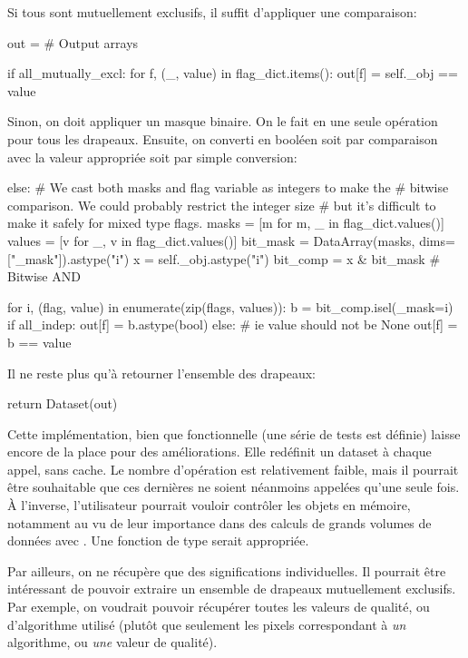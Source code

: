 Si tous sont mutuellement exclusifs, il suffit d'appliquer une comparaison:
\begin{pythonMiddle}[]
    out = {}  # Output arrays

    if all_mutually_excl:
        for f, (_, value) in flag_dict.items():
            out[f] = self._obj == value
\end{pythonMiddle}

Sinon, on doit appliquer un masque binaire. On le fait en une seule opération pour tous les drapeaux.
Ensuite, on converti en booléen soit par comparaison avec la valeur appropriée soit par simple conversion:
\begin{pythonMiddle}[]
    else:
        # We cast both masks and flag variable as integers to make the
        # bitwise comparison. We could probably restrict the integer size
        # but it's difficult to make it safely for mixed type flags.
        masks = [m for m, _ in flag_dict.values()]
        values = [v for _, v in flag_dict.values()]
        bit_mask = DataArray(masks, dims=["_mask"]).astype("i")
        x = self._obj.astype("i")
        bit_comp = x & bit_mask  # Bitwise AND

        for i, (flag, value) in enumerate(zip(flags, values)):
            b = bit_comp.isel(_mask=i)
            if all_indep:
                out[f] = b.astype(bool)
            else:  # ie value should not be None
                out[f] = b == value
\end{pythonMiddle}

Il ne reste plus qu'à retourner l'ensemble des drapeaux:
\begin{pythonLast}[]
    return Dataset(out)
\end{pythonLast}

Cette implémentation, bien que fonctionnelle (une série de tests est définie) laisse encore de la place pour des améliorations.
Elle redéfinit un dataset à chaque appel, sans cache. Le nombre d'opération est relativement faible, mais il pourrait être souhaitable que ces dernières ne soient néanmoins appelées qu'une seule fois.
À l'inverse, l'utilisateur pourrait vouloir contrôler les objets en mémoire, notamment au vu de leur importance dans des calculs de grands volumes de données avec . Une fonction de type  serait appropriée.

Par ailleurs, on ne récupère que des significations individuelles. Il pourrait être intéressant de pouvoir extraire un ensemble de drapeaux mutuellement exclusifs.
Par exemple, on voudrait pouvoir récupérer toutes les valeurs de qualité, ou d'algorithme utilisé (plutôt que seulement les pixels correspondant à \emph{un} algorithme, ou \emph{une} valeur de qualité).

